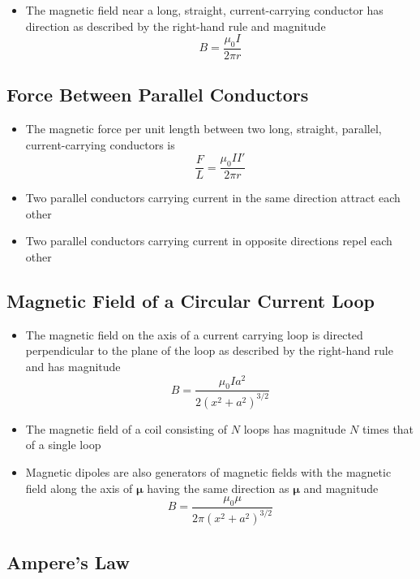 \documentclass{article}
\begin{document}
\begin{itemize}
  \item The magnetic field near a long, straight, current-carrying conductor has direction as described by the right-hand rule and magnitude \[B = \frac{\mu_0 I}{2 \pi r}\]
\end{itemize}

\subsection{Force Between Parallel Conductors}

\begin{itemize}
\item The magnetic force per unit length between two long, straight, parallel, current-carrying conductors is \[\frac{F}{L} = \frac{\mu_0 I I'}{2 \pi r}\]

  \item Two parallel conductors carrying current in the same direction attract each other

  \item Two parallel conductors carrying current in opposite directions repel each other
\end{itemize}

\subsection{Magnetic Field of a Circular Current Loop}

\begin{itemize}
  \item The magnetic field on the axis of a current carrying loop is directed perpendicular to the plane of the loop as described by the right-hand rule and has magnitude \[B = \frac{\mu_0 I a^2}{2 \left( x^2 + a^2 \right)^{3/2}}\]

  \item The magnetic field of a coil consisting of $N$ loops has magnitude $N$ times that of a single loop

  \item Magnetic dipoles are also generators of magnetic fields with the magnetic field along the axis of $\boldsymbol{\mu}$ having the same direction as $\boldsymbol{\mu}$ and magnitude \[B = \frac{\mu_0 \mu}{2 \pi \left( x^2 + a^2 \right)^{3/2}}\]
\end{itemize}

\subsection{Ampere's Law}
\end{document}

